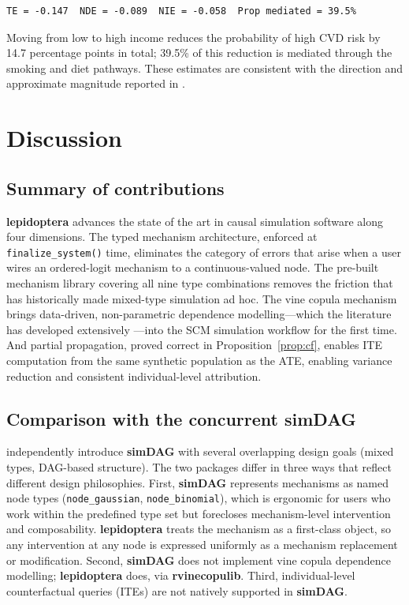 \documentclass[12pt,a4paper]{article}
\newcommand{\pkg}[1]{\textbf{#1}}
\newcommand{\code}[1]{\texttt{#1}}
\newcommand{\fct}[1]{\mbox{\texttt{#1()}}}
\begin{document}
\begin{tcolorbox}[outputbox, title={\small Output}]
\begin{verbatim}
TE = -0.147  NDE = -0.089  NIE = -0.058  Prop mediated = 39.5%
\end{verbatim}
\end{tcolorbox}

Moving from low to high income reduces the probability of high CVD risk by 14.7
percentage points in total; 39.5\% of this reduction is mediated through the
smoking and diet pathways. These estimates are consistent with the direction and
approximate magnitude reported in \citet{vanderweele2015explanation}.

\section{Discussion}
\label{sec:discussion}

\subsection{Summary of contributions}

\pkg{lepidoptera} advances the state of the art in causal simulation software
along four dimensions. The typed mechanism architecture, enforced at
\fct{finalize\_system} time, eliminates the category of errors that arise when a
user wires an ordered-logit mechanism to a continuous-valued node. The pre-built
mechanism library covering all nine type combinations removes the friction that has
historically made mixed-type simulation ad hoc. The vine copula mechanism brings
data-driven, non-parametric dependence modelling---which the literature has
developed extensively \citep{czado2019analyzing, nagler2022rvinecopulib}---into the
SCM simulation workflow for the first time. And partial propagation, proved correct
in Proposition~\ref{prop:cf}, enables ITE computation from the same synthetic
population as the ATE, enabling variance reduction and consistent individual-level
attribution.

\subsection{Comparison with the concurrent \pkg{simDAG}}

\citet{denz2026simdag} independently introduce \pkg{simDAG} with several
overlapping design goals (mixed types, DAG-based structure). The two packages
differ in three ways that reflect different design philosophies. First,
\pkg{simDAG} represents mechanisms as named node types (\code{node\_gaussian},
\code{node\_binomial}), which is ergonomic for users who work within the
predefined type set but forecloses mechanism-level intervention and composability.
\pkg{lepidoptera} treats the mechanism as a first-class object, so any
intervention at any node is expressed uniformly as a mechanism replacement or
modification. Second, \pkg{simDAG} does not implement vine copula dependence
modelling; \pkg{lepidoptera} does, via \pkg{rvinecopulib}. Third, individual-level
counterfactual queries (ITEs) are not natively supported in \pkg{simDAG}.
\end{document}

